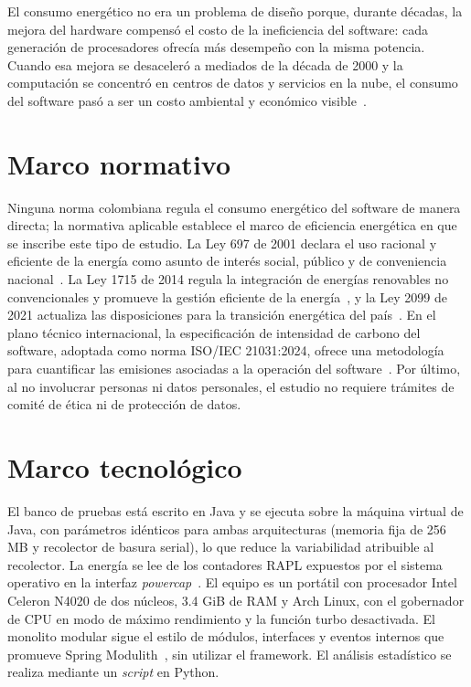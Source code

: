 El consumo energético no era un problema de diseño porque, durante décadas, la mejora del hardware compensó el costo de la ineficiencia del software: cada generación de procesadores ofrecía más desempeño con la misma potencia. Cuando esa mejora se desaceleró a mediados de la década de 2000 y la computación se concentró en centros de datos y servicios en la nube, el consumo del software pasó a ser un costo ambiental y económico visible~\cite{verdecchia2021green,marimuthu2017green}.

\section{Marco normativo}
\label{sec:marco-normativo}

Ninguna norma colombiana regula el consumo energético del software de manera directa; la normativa aplicable establece el marco de eficiencia energética en que se inscribe este tipo de estudio. La Ley 697 de 2001 declara el uso racional y eficiente de la energía como asunto de interés social, público y de conveniencia nacional~\cite{ley697}. La Ley 1715 de 2014 regula la integración de energías renovables no convencionales y promueve la gestión eficiente de la energía~\cite{ley1715}, y la Ley 2099 de 2021 actualiza las disposiciones para la transición energética del país~\cite{ley2099}. En el plano técnico internacional, la especificación de intensidad de carbono del software, adoptada como norma ISO/IEC 21031:2024, ofrece una metodología para cuantificar las emisiones asociadas a la operación del software~\cite{iso21031}. Por último, al no involucrar personas ni datos personales, el estudio no requiere trámites de comité de ética ni de protección de datos.

\section{Marco tecnológico}
\label{sec:marco-tecnologico}

El banco de pruebas está escrito en Java y se ejecuta sobre la máquina virtual de Java, con parámetros idénticos para ambas arquitecturas (memoria fija de 256 MB y recolector de basura serial), lo que reduce la variabilidad atribuible al recolector. La energía se lee de los contadores RAPL expuestos por el sistema operativo en la interfaz \textit{powercap}~\cite{khan2018rapl}. El equipo es un portátil con procesador Intel Celeron N4020 de dos núcleos, 3.4 GiB de RAM y Arch Linux, con el gobernador de CPU en modo de máximo rendimiento y la función turbo desactivada. El monolito modular sigue el estilo de módulos, interfaces y eventos internos que promueve Spring Modulith~\cite{springmodulith2025}, sin utilizar el framework. El análisis estadístico se realiza mediante un \textit{script} en Python.
